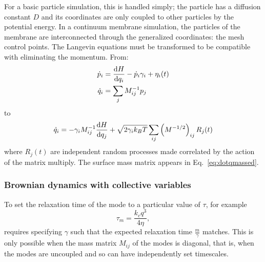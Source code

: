For a basic particle simulation, this is handled simply; the particle has a diffusion constant $D$ and its coordinates are only coupled to other particles by the potential energy.
In a continuum membrane simulation, the particles of the membrane are interconnected through the generalized coordinates: the mesh control points.
The Langevin equations must be transformed to be compatible with eliminating the momentum.
From:
\begin{align}
\dot{p}_i &= \frac{\textrm{d} H}{\textrm{d} q_i} - \dot{p}_i \gamma_i + \eta_i(t) \nonumber \\
\dot{q}_i &= \sum_j M_{ij}^{-1} p_j
\end{align}
to
\begin{equation}
\dot{q}_i = -\gamma_i M_{ij}^{-1} \frac{\textrm{d} H}{\textrm{d} q_j} + \sqrt{2 \gamma_i k_B T} \sum_{ij}\left(M^{-1/2}\right)_{ij} R_j(t)
\label{eq:dotqmassed}
\end{equation}
where $R_j(t)$ are independent random processes made correlated by the action of the matrix multiply.
The surface mass matrix appears in Eq.~\ref{eq:dotqmassed}. 



\subsubsection{Brownian dynamics with collective variables}

To set the relaxation time of the mode to a particular value of $\tau$, for example
\begin{equation}
\tau_m = \frac{k_c q^3}{4 \eta},
\end{equation}
requires specifying $\gamma$ such that the expected relaxation time $\frac{m}{\gamma}$ matches.
This is only possible when the mass matrix $M_{ij}$ of the modes is diagonal, that is, when the modes are uncoupled and so can have independently set timescales.











